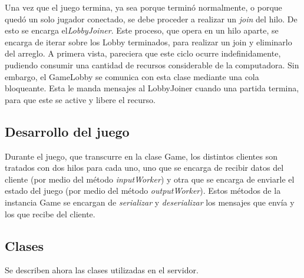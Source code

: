 \indent Una vez que el juego termina, ya sea porque terminó normalmente, o porque quedó un solo jugador conectado, se debe proceder a realizar un \emph{join} del hilo. De esto se encarga el\emph{LobbyJoiner}. Este proceso, que opera en un hilo aparte, se encarga de iterar sobre los Lobby terminados, para realizar un join y eliminarlo del arreglo. A primera vista, pareciera que este ciclo ocurre indefinidamente, pudiendo consumir una cantidad de recursos considerable de la computadora. Sin embargo, el GameLobby se comunica con esta clase mediante una cola bloqueante. Esta le manda mensajes al LobbyJoiner cuando una partida termina, para que este se active y libere el recurso.

\subsection{Desarrollo del juego}
Durante el juego, que transcurre en la clase Game, los distintos clientes son tratados con dos hilos para cada uno, uno que se encarga de recibir datos del cliente (por medio del método \emph{inputWorker}) y otra que se encarga de enviarle el estado del juego (por medio del método \emph{outputWorker}). Estos métodos de la instancia Game se encargan de \emph{serializar} y \emph{deserializar} los mensajes que envía y los que recibe del cliente.

\subsection{Clases}

Se describen ahora las clases utilizadas en el servidor.

